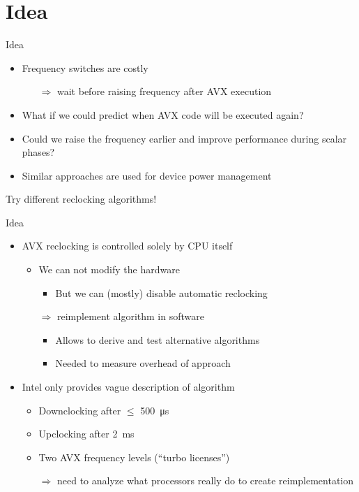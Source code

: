 \section{Idea}
\begin{frame}[t]{Idea}
	\begin{itemize}
		\item Frequency switches are costly
		\begin{itemize}
			\item[$\Rightarrow$] wait before raising frequency after AVX execution
		\end{itemize}
		\pause
		\item What if we could predict when AVX code will be executed again?
		\item Could we raise the frequency earlier and improve performance during scalar phases?
		\item Similar approaches are used for device power management
	\end{itemize}
	\pause
	\begin{center}
		\vspace{1em}
		Try different reclocking algorithms!
	\end{center}
\end{frame}

\begin{frame}[t]{Idea}
	\begin{itemize}
		\item AVX reclocking is controlled solely by CPU itself
		\begin{itemize}
			\item We can not modify the hardware
			\begin{itemize}
				\item But we can (mostly) disable automatic reclocking
			\end{itemize}
			\item[$\Rightarrow$] reimplement algorithm in software
			\begin{itemize}
				\item Allows to derive and test alternative algorithms
				\item Needed to measure overhead of approach
			\end{itemize}
		\end{itemize}
		\pause
		\item Intel only provides vague description of algorithm
		\begin{itemize}
			\item Downclocking after $\leq$ \SI{500}{\micro\second}
			\item Upclocking after \SI{2}{\milli\second}
			\item Two AVX frequency levels (\enquote{turbo licenses})
			\item[$\Rightarrow$] need to analyze what processors really do to create reimplementation
		\end{itemize}
	\end{itemize}
\end{frame}